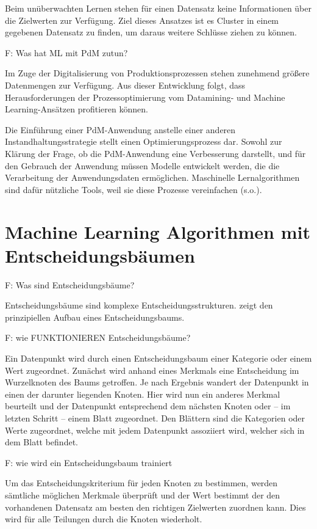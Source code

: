 Beim unüberwachten Lernen stehen für einen Datensatz keine Informationen über die Zielwerten zur Verfügung. Ziel dieses Ansatzes ist es Cluster in einem gegebenen Datensatz zu finden, um daraus weitere Schlüsse ziehen zu können.

F: Was hat ML mit PdM zutun?

Im Zuge der Digitalisierung von Produktionsprozessen stehen zunehmend größere Datenmengen zur Verfügung. Aus dieser Entwicklung folgt, dass Herausforderungen der Prozessoptimierung vom Datamining- und Machine Learning-Ansätzen profitieren können.~\cite[S.~35]{Schafer.25.09.201927.09.2019}

Die Einführung einer PdM-Anwendung anstelle einer anderen Instandhaltungsstrategie stellt einen Optimierungsprozess dar. Sowohl zur Klärung der Frage, ob die PdM-Anwendung eine Verbesserung darstellt, und für den Gebrauch der Anwendung müssen Modelle entwickelt werden, die die Verarbeitung der Anwendungsdaten ermöglichen. Maschinelle Lernalgorithmen sind dafür nützliche Tools, weil sie diese Prozesse vereinfachen (s.o.).
\section{Machine Learning Algorithmen mit Entscheidungsbäumen}
\label{sec:algorithmen_mit_entscheidungsbaum}
F: Was sind Entscheidungsbäume?

Entscheidungsbäume sind komplexe Entscheidungsstrukturen.  zeigt den prinzipiellen Aufbau eines Entscheidungsbaums.

F: wie FUNKTIONIEREN Entscheidungsbäume?

Ein Datenpunkt wird durch einen Entscheidungsbaum einer Kategorie oder einem Wert zugeordnet. Zunächst wird anhand eines Merkmals eine Entscheidung im Wurzelknoten des Baums getroffen. Je nach Ergebnis wandert der Datenpunkt in einen der darunter liegenden Knoten. Hier wird nun ein anderes Merkmal beurteilt und der Datenpunkt entsprechend dem nächsten Knoten oder -- im letzten Schritt -- einem Blatt zugeordnet. Den Blättern sind die Kategorien oder Werte zugeordnet, welche mit jedem Datenpunkt assoziiert wird, welcher sich in dem Blatt befindet. 

F: wie wird ein Entscheidungsbaum trainiert

Um das Entscheidungskriterium für jeden Knoten zu bestimmen, werden sämtliche möglichen Merkmale überprüft und der Wert bestimmt der den vorhandenen Datensatz am besten den richtigen Zielwerten zuordnen kann. Dies wird für alle Teilungen durch die Knoten wiederholt.~\cite{Muller.2017}

